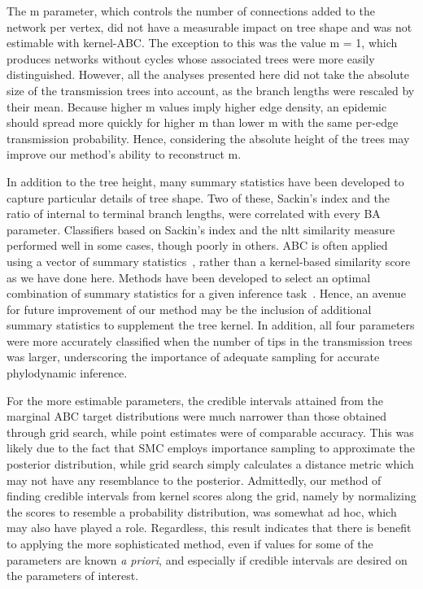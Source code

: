 %

The \gls{m} parameter, which controls the number of connections added to the
network per vertex, did not have a measurable impact on tree shape and was not
estimable with kernel-ABC. The exception to this was the value \gls{m} = 1,
which produces networks without cycles whose associated trees were more easily
distinguished. However, all the analyses presented here did not take the
absolute size of the transmission trees into account, as the branch lengths
were rescaled by their mean. Because higher \gls{m} values imply higher edge
density, an epidemic should spread more quickly for higher \gls{m} than lower
\gls{m} with the same per-edge transmission probability.  Hence, considering
the absolute height of the trees may improve our method's ability to
reconstruct \gls{m}.

In addition to the tree height, many summary statistics have been developed to
capture particular details of tree shape. Two of these, Sackin's index and the
ratio of internal to terminal branch lengths, were correlated with every
\gls{BA} parameter. Classifiers based on Sackin's index and the \gls{nltt}
similarity measure performed well in some cases, though poorly in others.
\gls{ABC} is often applied using a vector of summary
statistics~\autocite{marin2012approximate, sunnaaker2013approximate}, rather
than a kernel-based similarity score as we have done here. Methods have been
developed to select an optimal combination of summary statistics for a given
inference task~\autocite{fearnhead2012constructing}. Hence, an avenue for
future improvement of our method may be the inclusion of additional summary
statistics to supplement the tree kernel. In addition, all four parameters were
more accurately classified when the number of tips in the transmission trees
was larger, underscoring the importance of adequate sampling for accurate
phylodynamic inference.

For the more estimable parameters, the credible intervals attained from the
marginal \gls{ABC} target distributions were much narrower than those obtained
through grid search, while point estimates were of comparable accuracy. This
was likely due to the fact that \gls{SMC} employs importance sampling to
approximate the posterior distribution, while grid search simply calculates a
distance metric which may not have any resemblance to the posterior.
Admittedly, our method of finding credible intervals from kernel scores along
the grid, namely by normalizing the scores to resemble a probability
distribution, was somewhat ad hoc, which may also have played a role.
Regardless, this result indicates that there is benefit to applying the more
sophisticated method, even if values for some of the parameters are known
\textit{a priori}, and especially if credible intervals are desired on the
parameters of interest.

